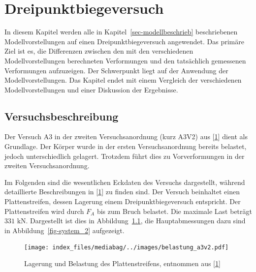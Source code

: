 \documentclass[
  12pt,
  letterpaper,
  egregdoesnotlikesansseriftitles]{scrreprt}
\begin{document}

\hypertarget{sec-dreipunkt}{%
\chapter{Dreipunktbiegeversuch}\label{sec-dreipunkt}}

In diesem Kapitel werden alle in Kapitel~\ref{sec-modellbeschrieb}
beschriebenen Modellvorstellungen auf einen Dreipunktbiegeversuch
angewendet. Das primäre Ziel ist es, die Differenzen zwischen den mit
den verschiedenen Modellvorstellungen berechneten Verformungen und den
tatsächlich gemessenen Verformungen aufzuzeigen. Der Schwerpunkt liegt
auf der Anwendung der Modellvorstellungen. Das Kapitel endet mit einem
Vergleich der verschiedenen Modellvorstellungen und einer Diskussion der
Ergebnisse.

\hypertarget{versuchsbeschreibung}{%
\section{Versuchsbeschreibung}\label{versuchsbeschreibung}}

Der Versuch A3 in der zweiten Versuchsanordnung (kurz A3V2) aus
{[}\protect\hyperlink{ref-Jaeger2006}{1}{]} dient als Grundlage. Der
Körper wurde in der ersten Versuchsanordnung bereits belastet, jedoch
unterschiedlich gelagert. Trotzdem führt dies zu Vorverformungen in der
zweiten Versuchsanordnung.

Im Folgenden sind die wesentlichen Eckdaten des Versuchs dargestellt,
während detaillierte Beschreibungen in
{[}\protect\hyperlink{ref-Jaeger2006}{1}{]} zu finden sind. Der Versuch
beinhaltet einen Plattenstreifen, dessen Lagerung einem
Dreipunktbiegeversuch entspricht. Der Plattenstreifen wird durch \(F_A\)
bis zum Bruch belastet. Die maximale Last beträgt \(331 \text{ kN}\).
Dargestellt ist dies in Abbildung~\ref{fig-lagerung_a3v2}, die
Hauptabmessungen dazu sind in Abbildung~\ref{fig-system_2} aufgezeigt.

\begin{figure}[H]

{\centering \texttt{[image: index\_files/mediabag/../images/belastung\_a3v2.pdf]}

}

\caption{\label{fig-lagerung_a3v2}Lagerung und Belastung des
Plattenstreifens, entnommen aus
{[}\protect\hyperlink{ref-Jaeger2006}{1}{]}}

\end{figure}
\end{document}
